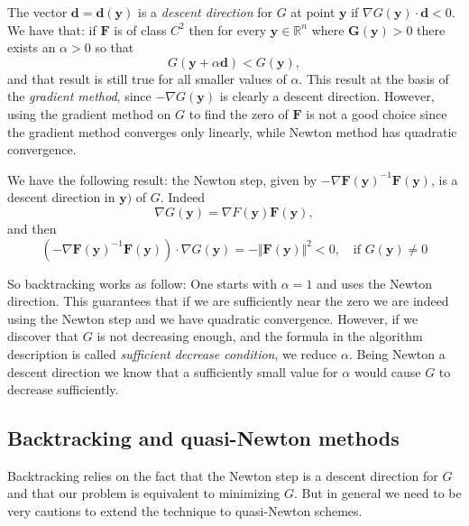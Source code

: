 \documentclass{article}
\begin{document}
The vector $\mathbf{d}=\mathbf{d}(\mathbf{y})$ is a \emph{descent direction} for $G$ at point $\mathbf{y}$ if $\nabla G(\mathbf{y})\cdot \mathbf{d}<0$. We have that: if $\mathbf{F}$ is of class $C^2$ then for every $\mathbf{y}\in\mathbb{R}^n$ where $\mathbf{G}(\mathbf{y})>0$ there exists an $\alpha >0$ so that
\[
G(\mathbf{y}+\alpha \mathbf{d})< G(\mathbf{y}),
\]
and that result is still true for all smaller values of $\alpha$.
This result at the basis of the \emph{gradient method}, since $-\nabla G(\mathbf{y})$ is clearly a descent direction. However, using the gradient method on $G$ to find the zero of $\mathbf{F}$ is not a good choice since the gradient method converges only linearly, while Newton method has quadratic convergence. 

We have the following result: the Newton step, given by $-\nabla\mathbf{F}(\mathbf{y})^{-1}\mathbf{F}(\mathbf{y})$, is a descent direction in $\mathbf{y})$ of $G$.
Indeed
\[
\nabla G(\mathbf{y})=\nabla F(\mathbf{y})\mathbf{F}(\mathbf{y}), 
\]
and then
\[
\left(-\nabla\mathbf{F}(\mathbf{y})^{-1}\mathbf{F}(\mathbf{y})\right)\cdot \nabla G(\mathbf{y})=-\Vert\mathbf{F}(\mathbf{y})\Vert^2<0,\quad \text{if } G(\mathbf{y})\ne 0
\]

So backtracking works as follow: One starts with $\alpha=1$ and uses the Newton direction. This guarantees that if we are sufficiently near the zero we are indeed using the Newton step and we have quadratic convergence. However, if we discover that $G$ is not decreasing enough, and the formula in the algorithm description is called \emph{sufficient decrease condition}, we reduce $\alpha$. Being Newton a descent direction we know that a sufficiently small value for $\alpha$ would cause $G$ to decrease sufficiently.

\subsection{Backtracking and quasi-Newton methods}
Backtracking relies on the fact that the Newton step is a descent direction for $G$ and that our problem is equivalent to minimizing $G$. But in general we need to be very cautions to extend the technique to quasi-Newton schemes. 
 
\end{document}
